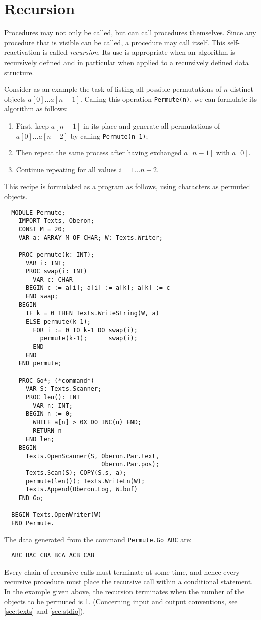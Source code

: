 \chapter{Recursion}
Procedures may not only be called, but can call procedures themselves. Since any procedure
that is visible can be called, a procedure may call itself. This self-reactivation is
called \emph{recursion}.  Its use is appropriate when an algorithm is recursively defined
and in particular when applied to a recursively defined data structure.

Consider as an example the task of listing all possible permutations of $n$ distinct objects
$a[0] \dots a[n-1]$. Calling this operation \verb|Permute(n)|, we can formulate its
algorithm as follows:
\begin{enumerate}
  \item[] First, keep $a[n-1]$ in its place and generate all permutations of $a[0] \dots
    a[n-2]$ by calling \verb|Permute(n-1)|;
  \item[] Then repeat the same process after having exchanged $a[n-1]$ with $a[0]$.
  \item[] Continue repeating for all values $i = 1\dots n-2$.
\end{enumerate}
This recipe is formulated as a program as follows, using characters as permuted objects.
\begin{verbatim}
  MODULE Permute;
    IMPORT Texts, Oberon;
    CONST M = 20;
    VAR a: ARRAY M OF CHAR; W: Texts.Writer;

    PROC permute(k: INT);
      VAR i: INT;
      PROC swap(i: INT)
        VAR c: CHAR
      BEGIN c := a[i]; a[i] := a[k]; a[k] := c
      END swap;
    BEGIN
      IF k = 0 THEN Texts.WriteString(W, a)
      ELSE permute(k-1);
        FOR i := 0 TO k-1 DO swap(i);
          permute(k-1);      swap(i);
        END
      END
    END permute;
 
    PROC Go*; (*command*)
      VAR S: Texts.Scanner;
      PROC len(): INT
        VAR n: INT;
      BEGIN n := 0;
        WHILE a[n] > 0X DO INC(n) END;
        RETURN n
      END len;
    BEGIN
      Texts.OpenScanner(S, Oberon.Par.text,
                           Oberon.Par.pos);
      Texts.Scan(S); COPY(S.s, a);
      permute(len()); Texts.WriteLn(W);
      Texts.Append(Oberon.Log, W.buf)
    END Go;
 
  BEGIN Texts.OpenWriter(W)
  END Permute.
\end{verbatim}
The data generated from the command \verb|Permute.Go ABC| are:
\begin{verbatim}
  ABC BAC CBA BCA ACB CAB
\end{verbatim}
Every chain of recursive calls must terminate at some time, and hence every recursive
procedure must place the recursive call within a conditional statement. In the example
given above, the recursion terminates when the number of the objects to be permuted is 1.
(Concerning input and output conventions, see \ref{sec:texts} and \ref{sec:stdio}).

